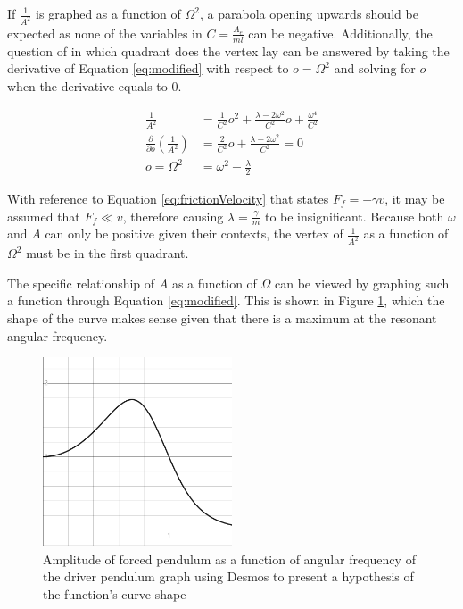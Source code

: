 \documentclass[letterpaper, 12pt]{article}
\begin{document}
If \(\frac{1}{A^2}\) is graphed as a function of \(\Omega^2\),
a parabola opening upwards should be expected as
none of the variables in
\(C = \frac{A_e}{ml}\) can be negative. Additionally,
the question of in which quadrant does the vertex lay can
be answered by taking the derivative of Equation \ref*{eq:modified}
with respect to \(o = \Omega^2\) and solving for \(o\) when
the derivative equals to 0.

\begin{align*}
    \frac{1}{A^2}                                           & = \frac{1}{C^2}o^2+ \frac{\lambda - 2\omega^2}{C^2}o + \frac{\omega^4}{C^2}
    \\
    \frac{\partial}{\partial o}\left( \frac{1}{A^2} \right) & = \frac{2}{C^2}o + \frac{\lambda - 2\omega^2}{C^2} = 0
    \\
    o = \Omega^2                                            & = \omega^2 - \frac{\lambda}{2}
\end{align*}

With reference to Equation \ref*{eq:frictionVelocity} that states
\(F_f = -\gamma v\), it may be assumed that \(F_f \ll v\),
therefore causing \(\lambda = \frac{\gamma}{m}\) to be
insignificant. Because both \(\omega\) and \(A\) can only
be positive given their contexts, the vertex of
\(\frac{1}{A^2}\) as a function of \(\Omega^2\)
must be in the first quadrant.

The specific relationship of \(A\) as a function of \(\Omega\)
can be viewed by graphing such a function through
Equation \ref*{eq:modified}. This is shown in Figure
\ref*{fig:hypothesis}, which the shape of the curve
makes sense given that there is a maximum
at the resonant angular frequency.

\begin{figure}[H]
    \centering
    \includegraphics[width=0.5\textwidth]{hypothesis.png}
    \caption{Amplitude of forced pendulum as a function of angular frequency of the driver pendulum graph using Desmos to present a hypothesis of the function's curve shape}
    \label{fig:hypothesis}
\end{figure}
\end{document}

